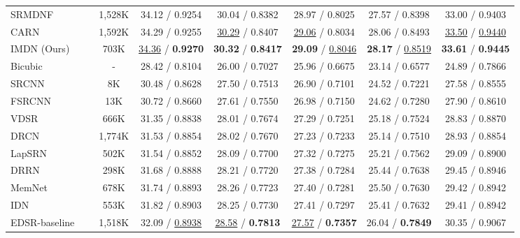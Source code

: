 \documentclass[sigconf]{acmart}
\begin{document}
\begin{table*}[htpb]
\begin{tabular}{|l|c|c|c|c|c|c|c|}
		SRMDNF~\cite{SRMDNF} &  & 1,528K & 34.12 / 0.9254 & 30.04 / 0.8382 & 28.97 / 0.8025 & 27.57 / 0.8398 & 33.00 / 0.9403 \\
		
		CARN~\cite{CARN} &  & 1,592K & 34.29 / 0.9255 & \underline{30.29} / 0.8407 & \underline{29.06} / 0.8034 & 28.06 / 0.8493 & \underline{33.50} / \underline{0.9440} \\
		
		IMDN (Ours) &  & 703K & \underline{34.36} / \textbf{0.9270} & \textbf{30.32} / \textbf{0.8417} & \textbf{29.09} / \underline{0.8046} & \textbf{28.17} / \underline{0.8519} & \textbf{33.61} / \textbf{0.9445} \\
		
		\hline
		\hline
Bicubic & \multirow{13}{*}{} & - & 28.42 / 0.8104 & 26.00 / 0.7027 & 25.96 / 0.6675 & 23.14 / 0.6577 & 24.89 / 0.7866 \\
		
		SRCNN~\cite{SRCNN} &  & 8K & 30.48 / 0.8628 & 27.50 / 0.7513 & 26.90 / 0.7101 & 24.52 / 0.7221 & 27.58 / 0.8555 \\
		
		FSRCNN~\cite{FSRCNN} &  & 13K & 30.72 / 0.8660 & 27.61 / 0.7550 & 26.98 / 0.7150 & 24.62 / 0.7280 &  27.90 / 0.8610 \\
		
		VDSR~\cite{VDSR} &  & 666K & 31.35 / 0.8838 & 28.01 / 0.7674 & 27.29 / 0.7251 & 25.18 / 0.7524 & 28.83 / 0.8870 \\
		
		DRCN~\cite{DRCN} &  & 1,774K & 31.53 / 0.8854 & 28.02 / 0.7670 & 27.23 / 0.7233 & 25.14 / 0.7510 & 28.93 / 0.8854 \\
		
		LapSRN~\cite{LapSRN} &  & 502K & 31.54 / 0.8852 & 28.09 / 0.7700 & 27.32 / 0.7275 & 25.21 / 0.7562 & 29.09 / 0.8900 \\
		
		DRRN~\cite{DRRN} &  & 298K & 31.68 / 0.8888 & 28.21 / 0.7720 & 27.38 / 0.7284 & 25.44 / 0.7638 & 29.45 / 0.8946 \\
		
		MemNet~\cite{MemNet} &  & 678K & 31.74 / 0.8893 & 28.26 / 0.7723 & 27.40 / 0.7281 & 25.50 / 0.7630 & 29.42 / 0.8942 \\
		
		IDN~\cite{IDN} &  & 553K & 31.82 / 0.8903 & 28.25 / 0.7730 & 27.41 / 0.7297 &  25.41 / 0.7632 & 29.41 / 0.8942 \\
		
		EDSR-baseline~\cite{EDSR} &  & 1,518K & 32.09 / \underline{0.8938} &  \underline{28.58} / \textbf{0.7813} & \underline{27.57} / \textbf{0.7357} & 26.04 /  \textbf{0.7849} & 30.35 / 0.9067 \\
		

\end{tabular}
\end{table*}
\end{document}

